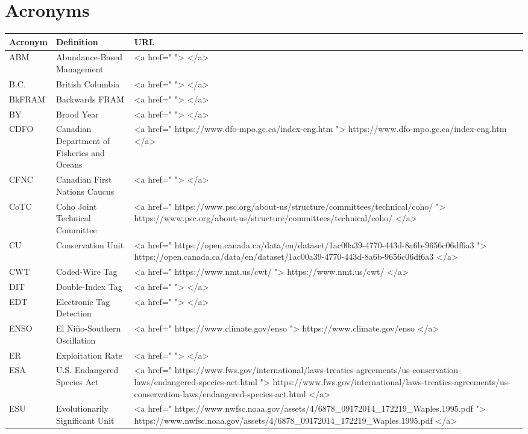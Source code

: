\documentclass[
  letterpaper,
  DIV=11,
  numbers=noendperiod]{scrartcl}
\begin{document}
\section{Acronyms}\label{acronyms}

\begin{table}
\fontsize{12.0pt}{14.4pt}\selectfont
\begin{tabular*}{\linewidth}{@{\extracolsep{\fill}}lll}
\toprule
Acronym & Definition & URL \\ 
\midrule\addlinespace[2.5pt]
ABM & Abundance-Based Management & <a href="  ">  </a> \\ 
B.C. & British Columbia & <a href="  ">  </a> \\ 
BkFRAM & Backwards FRAM & <a href="  ">  </a> \\ 
BY & Brood Year & <a href="  ">  </a> \\ 
CDFO & Canadian Department of Fisheries and Oceans & <a href=" https://www.dfo-mpo.gc.ca/index-eng.htm "> https://www.dfo-mpo.gc.ca/index-eng.htm </a> \\ 
CFNC & Canadian First Nations Caucus & <a href="  ">  </a> \\ 
CoTC & Coho Joint Technical Committee & <a href=" https://www.psc.org/about-us/structure/committees/technical/coho/ "> https://www.psc.org/about-us/structure/committees/technical/coho/ </a> \\ 
CU & Conservation Unit & <a href=" https://open.canada.ca/data/en/dataset/1ac00a39-4770-443d-8a6b-9656c06df6a3 "> https://open.canada.ca/data/en/dataset/1ac00a39-4770-443d-8a6b-9656c06df6a3 </a> \\ 
CWT & Coded-Wire Tag & <a href=" https://www.nmt.us/cwt/ "> https://www.nmt.us/cwt/ </a> \\ 
DIT & Double-Index Tag & <a href="  ">  </a> \\ 
EDT & Electronic Tag Detection & <a href="  ">  </a> \\ 
ENSO & El Niño-Southern Oscillation & <a href=" https://www.climate.gov/enso "> https://www.climate.gov/enso </a> \\ 
ER & Exploitation Rate & <a href="  ">  </a> \\ 
ESA & U.S. Endangered Species Act & <a href=" https://www.fws.gov/international/laws-treaties-agreements/us-conservation-laws/endangered-species-act.html "> https://www.fws.gov/international/laws-treaties-agreements/us-conservation-laws/endangered-species-act.html </a> \\ 
ESU & Evolutionarily Significant Unit & <a href=" https://www.nwfsc.noaa.gov/assets/4/6878_09172014_172219_Waples.1995.pdf "> https://www.nwfsc.noaa.gov/assets/4/6878_09172014_172219_Waples.1995.pdf </a> \\ 

\end{tabular*}
\end{table}
\end{document}
